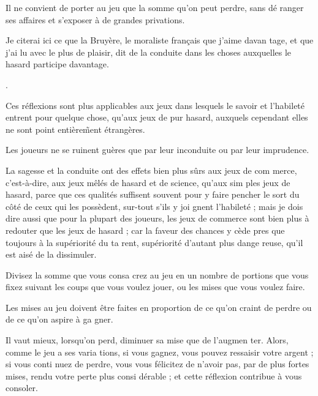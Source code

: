 Il ne convient de porter au jeu que
la somme qu'on peut perdre, sans dé%
ranger ses affaires et s'exposer à de
grandes privations.

Je citerai ici ce que la Bruyère, le
moraliste français que j'aime davan%
tage, et que j'ai lu avec le plus de
plaisir, dit de la conduite dans les
choses auxquelles le hasard participe
davantage.

.

Ces réflexions sont plus applicables
aux jeux dans lesquels le savoir et
l'habileté entrent pour quelque chose,
qu'aux jeux de pur hasard, auxquels
cependant elles ne sont point entière\~%
ment étrangères.

Les joueurs ne se ruinent guères
que par leur inconduite ou par leur
imprudence.

La sagesse et la conduite ont des
effets bien plus sûrs aux jeux de com%
merce, c'est-à-dire, aux jeux mêlés
de hasard et de science, qu'aux sim%
ples jeux de hasard, parce que ces
qualités suffisent souvent pour y
faire pencher le sort du côté de ceux
qui les possèdent, sur-tout s'ils y joi%
gnent l'habileté ; mais je dois dire
aussi que pour la plupart des joueurs,
les jeux de commerce sont bien plus
à redouter que les jeux de hasard ;
car la faveur des chances y cède  pres%
que toujours à la supériorité du ta%
rent, supériorité d'autant plus dange%
reuse, qu'il est aisé de la dissimuler.

Divisez la somme que vous consa%
crez au jeu en un nombre de portions
que vous fixez suivant les coups que
vous voulez jouer, ou les mises que
vous voulez faire.

Les mises au jeu doivent être faites
en proportion de ce qu'on craint de
perdre ou de ce qu'on aspire à ga%
gner.

Il vaut mieux, lorsqu'on perd,
diminuer sa mise que de l'augmen%
ter. Alors, comme le jeu a ses varia%
tions, si vous gagnez, vous pouvez
ressaisir votre argent ; si vous conti%
nuez de perdre, vous vous félicitez
de n'avoir pas, par de plus fortes
mises, rendu votre perte plus consi%
dérable ;  et cette réflexion contribue
à vous consoler.

